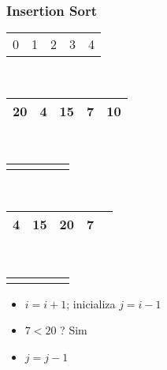 \documentclass{beamer}
\begin{document}
\begin{frame}
    \frametitle{Insertion Sort}
    \begin{center}
        \begin{table}
            \begin{tabular}{p{0.25cm} p{0.25cm} p{0.25cm} p{0.25cm} p{0.25cm}}
                0 & 1 & 2 & 3 & 4
            \end{tabular} \\
            \begin{tabular}{| p{0.25cm} | p{0.25cm} | p{0.25cm} | p{0.25cm} | p{0.25cm} |}
                \hline
                20 & 4 & 15 & 7 & 10 \\ \hline
            \end{tabular} \\
            \begin{tabular}{p{0.25cm} p{0.25cm} p{0.25cm} p{0.25cm} p{0.25cm}}
                & & & \color{blue}{$\updownarrow$} &
            \end{tabular} \\
            \begin{tabular}{| p{0.25cm} | p{0.25cm} | p{0.25cm} | p{0.25cm} | p{0.25cm} |}
                \hline
                4 & 15 & 20 & 7 & \\ \hline
            \end{tabular} \\
            \begin{tabular}{p{0.25cm} p{0.25cm} p{0.25cm} p{0.25cm} p{0.25cm}}
                & & \color{red}{$\uparrow$}  & \color{blue}{$\uparrow$} &
            \end{tabular}
        \end{table}
	\end{center}
    \begin{itemize}[<+->]
        \item $i = i + 1$; inicializa $j = i - 1$
        \item $7 < 20$ ? Sim
        \item $j = j - 1$
    \end{itemize}
\end{frame}
\end{document}
